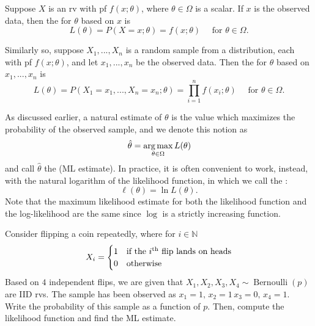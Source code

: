 \documentclass[notoc,notitlepage]{tufte-book}
\DeclareMathOperator{\Bernoulli}{Bernoulli }
\begin{document}
\begin{defn}
\label{defn:likelihood_function}
  Suppose $X$ is an rv with pf $f(x; \theta)$, where $\theta \in \Omega$ is a scalar. If $x$ is the observed data, then the  for $\theta$ based on $x$ is
  \begin{equation*}
    L(\theta) = P(X = x; \theta) = f(x; \theta) \quad \text{ for } \theta \in \Omega.
  \end{equation*}

  Similarly so, suppose $X_1, ..., X_n$ is a random sample from a distribution, each with pf $f(x; \theta)$, and let $x_1, ..., x_n$ be the observed data. Then the  for $\theta$ based on $x_1, ..., x_n$ is
  \begin{equation*}
    L(\theta) = P(X_1 = x_1, ..., X_n = x_n ; \theta) = \prod_{i=1}^{n} f(x_i; \theta) \quad \text{ for } \theta \in \Omega.
  \end{equation*}
\end{defn}

\begin{note}
  As discussed earlier, a natural estimate of $\theta$ is the value which maximizes the probability of the observed sample, and we denote this notion as
  \begin{equation*}
    \hat{\theta} = \operatorname*{arg\,max}_{\theta \in \Omega} L(\theta)
  \end{equation*}
  and call $\hat{\theta}$ the  (ML estimate). In practice, it is often convenient to work, instead, with the natural logarithm of the likelihood function, in which we call the :
  \begin{equation*}
    \ell(\theta) = \ln L(\theta).
  \end{equation*}
  Note that the maximum likelihood estimate for both the likelihood function and the log-likelihood are the same since $\log$ is a strictly increasing function.
\end{note}

\begin{eg}[Example 6.1]\label{eg:6_1}
  Consider flipping a coin repeatedly, where for $i \in \mathbb{N}$
  \begin{equation*}
    X_i = \begin{cases}
      1 & \text{if the } i \text{\textsuperscript{th} flip lands on heads} \\
      0 & \text{otherwise}
    \end{cases}
  \end{equation*}
  Based on $4$ independent flips, we are given that $X_1, X_2, X_3, X_4 \sim \Bernoulli(p)$ are IID rvs. The sample has been observed as $x_1 = 1, \, x_2 = 1 \, x_3 = 0, \, x_4 = 1$. Write the probability of this sample as a function of $p$. Then, compute the likelihood function and find the ML estimate.
\end{eg}
\end{document}
